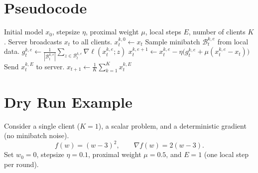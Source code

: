 \documentclass{article}
\begin{document}
\section*{Pseudocode}
\begin{algorithm}[H]
\caption{FedProx}
\begin{algorithmic}[1]
\Require Initial model $x_0$, stepsize $\eta$, proximal weight $\mu$, local steps $E$, number of clients $K$.
    \State Server broadcasts $x_t$ to all clients.
        \State $x_{t}^{k,0}\gets x_t$
            \State Sample minibatch $\mathcal{B}_{t}^{k,e}$ from local data.
            \State $g_{t}^{k,e}\gets \frac{1}{|\mathcal{B}_{t}^{k,e}|}\sum_{z\in\mathcal{B}_{t}^{k,e}}\nabla\ell(x_{t}^{k,e};z)$
            \State $x_{t}^{k,e+1}\gets x_{t}^{k,e}-\eta\bigl(g_{t}^{k,e}+\mu(x_{t}^{k,e}-x_t)\bigr)$   
        \EndFor
        \State Send $x_{t}^{k,E}$ to server.
    \EndFor
    \State $x_{t+1}\gets \frac{1}{K}\sum_{k=1}^{K}x_{t}^{k,E}$   
\EndFor
\end{algorithmic}
\end{algorithm}

\section*{Dry Run Example}
Consider a single client ($K=1$), a scalar problem, and a deterministic gradient (no minibatch noise).  
\[
f(w)=(w-3)^2,\qquad \nabla f(w)=2(w-3).
\]
Set $w_0=0$, stepsize $\eta=0.1$, proximal weight $\mu=0.5$, and $E=1$ (one local step per round).  
\end{document}
